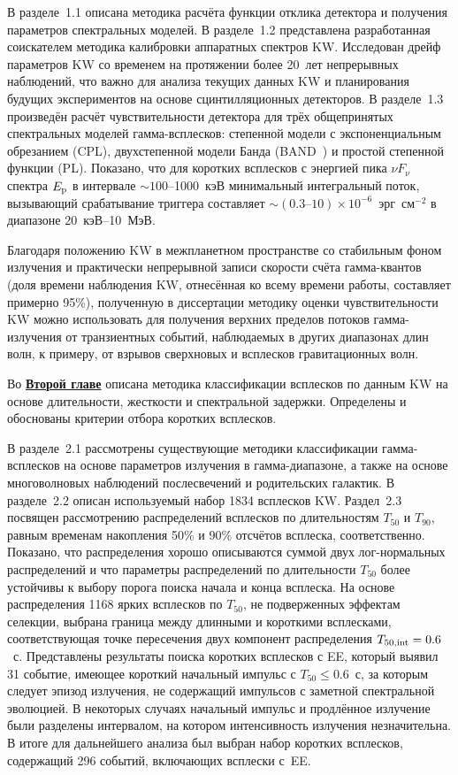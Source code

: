 В разделе~1.1 описана методика расчёта функции отклика детектора и 
получения параметров спектральных моделей. В разделе~1.2 представлена 
разработанная соискателем методика калибровки аппаратных спектров KW. 
Исследован дрейф параметров KW со временем на протяжении 
более 20~лет непрерывных наблюдений, что важно для анализа текущих данных KW и 
планирования будущих экспериментов на основе сцинтилляционных детекторов.
В разделе~1.3 произведён расчёт чувствительности детектора для трёх общепринятых 
спектральных моделей гамма-всплесков: степенной модели с экспоненциальным обрезанием (CPL),
двухстепенной модели Банда (BAND~\citep{Band_1993ApJ}) и простой степенной функции (PL).
Показано, что для коротких всплесков с энергией пика $\nu F_{\nu}$ 
спектра $E_{\mathrm{p}}$ в интервале
$\sim 100$--1000~кэВ минимальный интегральный поток, вызывающий срабатывание триггера
составляет $\sim (0.3\textrm{--}10) \times 10^{-6}$~эрг~см$^{-2}$ в диапазоне 20~кэВ--10~МэВ.

Благодаря положению KW в межпланетном пространстве со стабильным 
фоном излучения и практически непрерывной записи скорости счёта гамма-квантов 
(доля времени наблюдения KW, отнесённая ко всему времени работы, составляет 
примерно 95\%), полученную в диссертации методику оценки чувствительности KW
можно использовать для получения верхних пределов потоков гамма-излучения  
от транзиентных событий, наблюдаемых в других диапазонах длин волн, к примеру, 
от взрывов сверхновых и всплесков гравитационных волн.

Во \underline{\textbf{Второй главе}} описана методика классификации всплесков 
по данным KW на основе длительности, жесткости и спектральной задержки. 
Определены и обоснованы критерии отбора коротких всплесков.

В разделе~2.1 рассмотрены существующие методики классификации гамма-всплесков на основе 
параметров излучения в гамма-диапазоне, а также на основе многоволновых наблюдений 
послесвечений и родительских галактик. В разделе~2.2 описан используемый набор 1834 всплесков KW.
Раздел~2.3 посвящен рассмотрению распределений всплесков по длительностям $T_{50}$ и $T_{90}$, 
равным временам накопления 50\% и 90\% отсчётов всплеска, соответственно. Показано,
что распределения хорошо описываются суммой двух лог-нормальных распределений и 
что параметры распределений по длительности $T_{50}$ более устойчивы к выбору 
порога поиска начала и конца всплеска. На основе распределения 1168 ярких всплесков по $T_{50}$,
не подверженных эффектам селекции, выбрана граница между длинными и  короткими всплесками, 
соответствующая точке пересечения двух компонент распределения $T_{50{\mathrm{,int}}} = 0.6$~с.
Представлены результаты поиска коротких всплесков с EE, который выявил 31
событие, имеющее короткий начальный импульс с $T_{50} \le 0.6$~с, за
которым следует эпизод излучения, не содержащий импульсов с заметной
спектральной эволюцией. В некоторых случаях начальный импульс и продлённое
излучение были разделены интервалом, на котором интенсивность излучения незначительна.
В итоге для дальнейшего анализа был выбран набор коротких всплесков, содержащий 296 событий, 
включающих всплески с~EE.  


